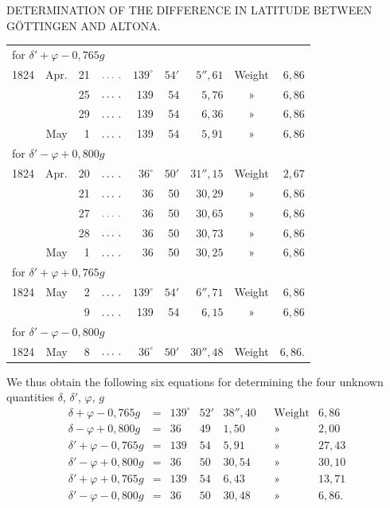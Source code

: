 \clearpage
\noindent{}\parbox[t]{\dimexpr\textwidth-10mm\relax}{\centering\scriptsize DETERMINATION OF THE DIFFERENCE IN LATITUDE BETWEEN GÖTTINGEN AND ALTONA.}\par
\begin{center}
\begin{tabular}{rrrc rr r c r}
\multicolumn{9}{l}{for $\delta'+\varphi-0{,}765g$}\\
1824&Apr.&21&$\ldots\,\ldotp$&$139^\circ$&$54'$&$5''{,}61$&Weight&$6{,}86$\\
&&25&$\ldots\,\ldotp$&139&54&$5{,}76$&»&$6{,}86$\\
&&29&$\ldots\,\ldotp$&139&54&$6{,}36$&»&$6{,}86$\\
&May&1&$\ldots\,\ldotp$&139&54&$5{,}91$&»&$6{,}86$\\
\multicolumn{9}{l}{for $\delta'-\varphi+0{,}800g$}\\
1824&Apr.&20&$\ldots\,\ldotp$&$36^\circ$&$50'$&$31''{,}15$&Weight&$2{,}67$\\
&&21&$\ldots\,\ldotp$&36&50&$30{,}29$&»&$6{,}86$\\
&&27&$\ldots\,\ldotp$&36&50&$30{,}65$&»&$6{,}86$\\
&&28&$\ldots\,\ldotp$&36&50&$30{,}73$&»&$6{,}86$\\
&May&1&$\ldots\,\ldotp$&36&50&$30{,}25$&»&$6{,}86$\\
\multicolumn{9}{l}{for $\delta'+\varphi+0{,}765g$}\\
1824&May&2&$\ldots\,\ldotp$&$139^\circ$&$54'$&$6''{,}71$&Weight&$6{,}86$\\
&&9&$\ldots\,\ldotp$&139&54&$6{,}15$&»&$6{,}86$\\
\multicolumn{9}{l}{for $\delta'-\varphi-0{,}800g$}\\
1824&May&8&$\ldots\,\ldotp$&$36^\circ$&$50'$&$30''{,}48$&Weight&$6{,}86$.
\end{tabular}
\end{center}
We thus obtain the following six equations for determining the four unknown quantities $\delta$, $\delta'$, $\varphi$, $g$
\[
\begin{array}{rclrrrcr}
\delta+\varphi-0{,}765g&=&139^\circ&52'&38''{,}40&&\text{Weight}&6{,}86\\
\delta-\varphi+0{,}800g&=&36&49&1{,}50&&\text{»}&2{,}00\\
\delta'+\varphi-0{,}765g&=&139&54&5{,}91&&\text{»}&27{,}43\\
\delta'-\varphi+0{,}800g&=&36&50&30{,}54&&\text{»}&30{,}10\\
\delta'+\varphi+0{,}765g&=&139&54&6{,}43&&\text{»}&13{,}71\\
\delta'-\varphi-0{,}800g&=&36&50&30{,}48&&\text{»}&6{,}86.
\end{array}
\]
